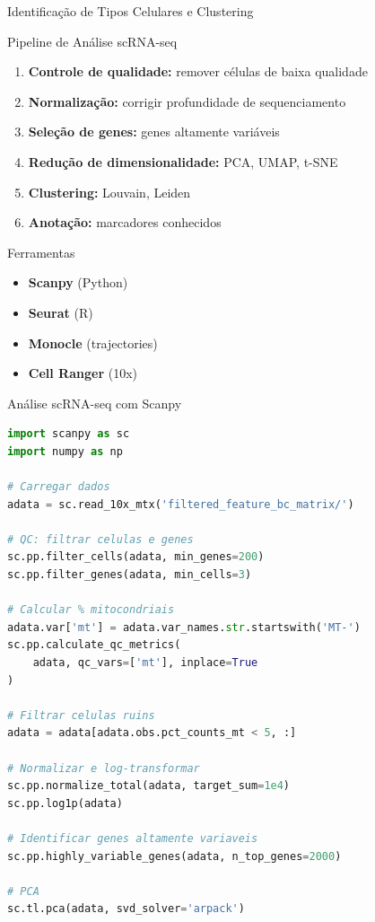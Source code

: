 \begin{frame}{Identificação de Tipos Celulares e Clustering}
\begin{block}{Pipeline de Análise scRNA-seq}
\begin{enumerate}
    \item \textbf{Controle de qualidade:} remover células de baixa qualidade
    \item \textbf{Normalização:} corrigir profundidade de sequenciamento
    \item \textbf{Seleção de genes:} genes altamente variáveis
    \item \textbf{Redução de dimensionalidade:} PCA, UMAP, t-SNE
    \item \textbf{Clustering:} Louvain, Leiden
    \item \textbf{Anotação:} marcadores conhecidos
\end{enumerate}
\end{block}

\vspace{0.3cm}

\begin{exampleblock}{Ferramentas}
\begin{itemize}
    \item \textbf{Scanpy} (Python)
    \item \textbf{Seurat} (R)
    \item \textbf{Monocle} (trajectories)
    \item \textbf{Cell Ranger} (10x)
\end{itemize}
\end{exampleblock}
\end{frame}

\begin{frame}[fragile]{Análise scRNA-seq com Scanpy}
\begin{lstlisting}[language=Python, caption=Análise básica com scanpy, basicstyle=\ttfamily\footnotesize]
import scanpy as sc
import numpy as np

# Carregar dados
adata = sc.read_10x_mtx('filtered_feature_bc_matrix/')

# QC: filtrar celulas e genes
sc.pp.filter_cells(adata, min_genes=200)
sc.pp.filter_genes(adata, min_cells=3)

# Calcular % mitocondriais
adata.var['mt'] = adata.var_names.str.startswith('MT-')
sc.pp.calculate_qc_metrics(
    adata, qc_vars=['mt'], inplace=True
)

# Filtrar celulas ruins
adata = adata[adata.obs.pct_counts_mt < 5, :]

# Normalizar e log-transformar
sc.pp.normalize_total(adata, target_sum=1e4)
sc.pp.log1p(adata)

# Identificar genes altamente variaveis
sc.pp.highly_variable_genes(adata, n_top_genes=2000)

# PCA
sc.tl.pca(adata, svd_solver='arpack')
\end{lstlisting}
\end{frame}

